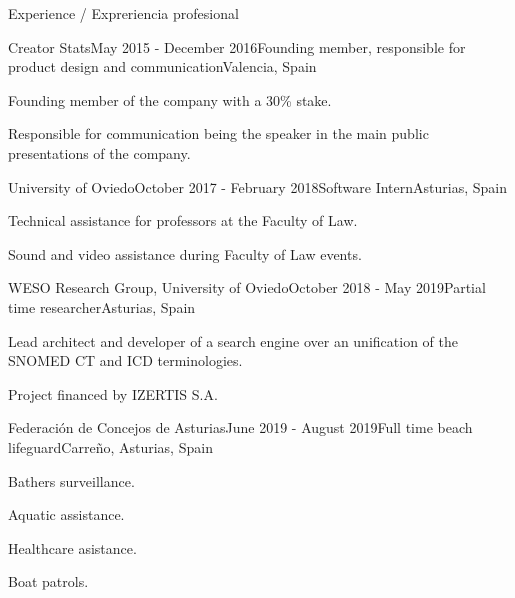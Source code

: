 \documentclass{resume} %
\begin{document}
\begin{rSection}{Experience / Expreriencia profesional}

\begin{rSubsection}{Creator Stats}{May 2015 - December 2016}{Founding member, responsible for product design and communication}{Valencia, Spain}
\item Founding member of the company with a 30\% stake.
\item Responsible for communication being the speaker in the main public presentations of the company.
\end{rSubsection}


\begin{rSubsection}{University of Oviedo}{October 2017 - February 2018}{Software Intern}{Asturias, Spain}
    \item Technical assistance for professors at the Faculty of Law.
    \item Sound and video assistance during Faculty of Law events.
    \end{rSubsection}


\begin{rSubsection}{WESO Research Group, University of Oviedo}{October 2018 - May 2019}{Partial time researcher}{Asturias, Spain}
    \item Lead architect and developer of a search engine over an unification of the SNOMED CT and ICD terminologies.
    \item Project financed by IZERTIS S.A.
    \end{rSubsection}


\begin{rSubsection}{Federación de Concejos de Asturias}{June 2019 - August 2019}{Full time beach lifeguard}{Carreño, Asturias, Spain}
    \item Bathers surveillance.
    \item Aquatic assistance.
    \item Healthcare asistance. 
    \item Boat patrols.
    \end{rSubsection}



\end{rSection}
\end{document}
